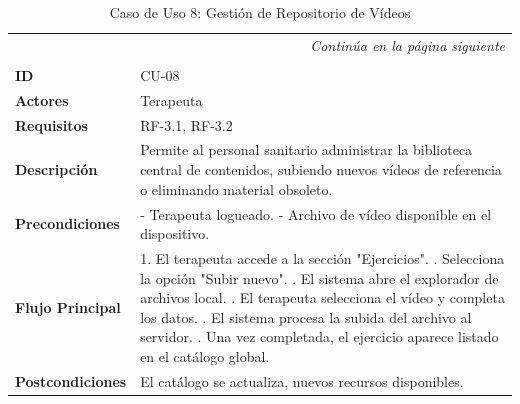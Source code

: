 \clearpage
\begin{longtable}{p{} p{}}
    \toprule
    \endfirsthead
    \toprule
    \endhead
    \midrule
    \multicolumn{2}{r}{\small\itshape Continúa en la página siguiente} \\
    \endfoot
    \bottomrule
    \noalign{\vspace{0.5cm}}
    \caption{Caso de Uso 8: Gestión de Repositorio de Vídeos} \label{cu:8} \\
    \endlastfoot

    \textbf{ID} & CU-08 \\ \midrule
    \textbf{Actores} & Terapeuta \\ \midrule
    \textbf{Requisitos} & RF-3.1, RF-3.2 \\ \midrule
    \textbf{Descripción} & Permite al personal sanitario administrar la biblioteca central de contenidos, subiendo nuevos vídeos de referencia o eliminando material obsoleto. \\ \midrule
    \textbf{Precondiciones} & 
    - Terapeuta logueado. \newline
    - Archivo de vídeo disponible en el dispositivo. \\ \midrule
    \textbf{Flujo Principal} & 
    1. El terapeuta accede a la sección "Ejercicios". \newline
    2. Selecciona la opción "Subir nuevo". \newline
    3. El sistema abre el explorador de archivos local. \newline
    4. El terapeuta selecciona el vídeo y completa los datos. \newline
    5. El sistema procesa la subida del archivo al servidor. \newline
    6. Una vez completada, el ejercicio aparece listado en el catálogo global. \\ \midrule
    \textbf{Postcondiciones} & El catálogo se actualiza, nuevos recursos disponibles. \\
\end{longtable}



